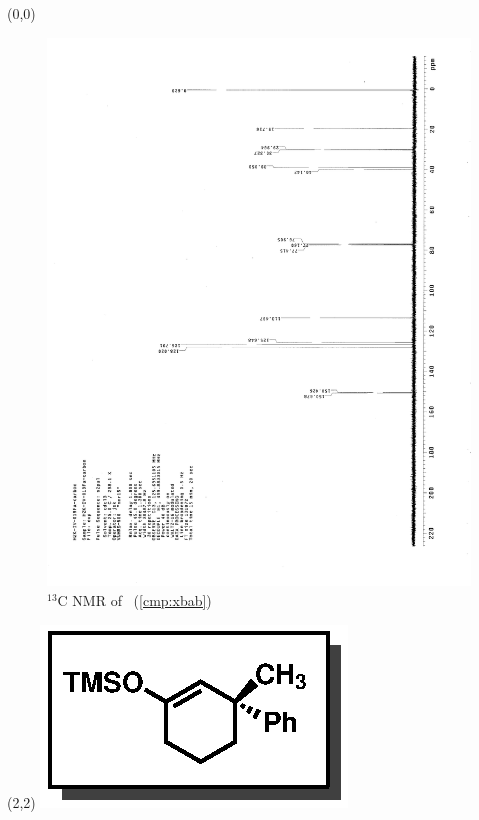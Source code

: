 \clearpage
\begin{textblock}{20}(0,0)
\begin{figure}[htb]
\caption{$^{13}$C NMR of  \CMPxbab\ (\ref{cmp:xbab})}
\includegraphics[scale=0.75, trim = 0mm 0mm 0mm 5mm,
clip]{chp_singlecarbon/images/nmr/xbabC}
\vspace{-100pt}
\end{figure}
\end{textblock}
\begin{textblock}{1}(2,2)
\includegraphics[scale=0.8, angle=90]{chp_singlecarbon/images/xbab}
\end{textblock}
\clearpage

